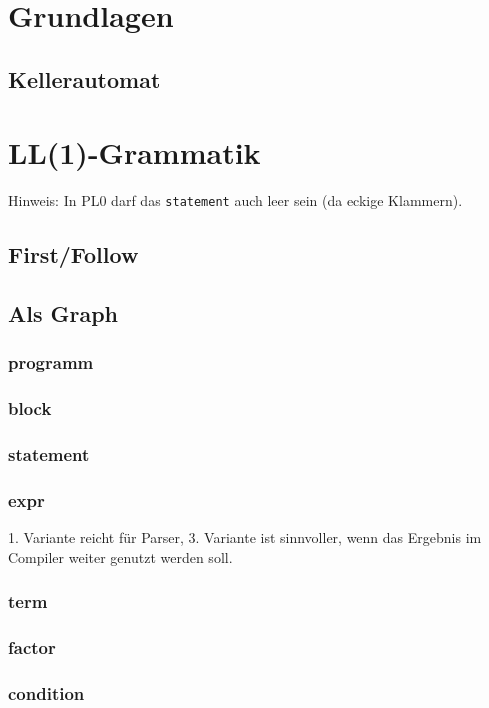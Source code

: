 \section{Grundlagen}
\subsection{Kellerautomat}

\section{LL(1)-Grammatik}
Hinweis: In PL0 darf das \lstinline`statement` auch leer sein (da eckige Klammern).
\subsection{First/Follow}
\subsection{Als Graph}
\subsubsection{programm}
\subsubsection{block}
\subsubsection{statement}
\subsubsection{expr}
1. Variante reicht für Parser, 3. Variante ist sinnvoller, wenn das Ergebnis im Compiler weiter genutzt werden soll.
\subsubsection{term}
\subsubsection{factor}
\subsubsection{condition}
